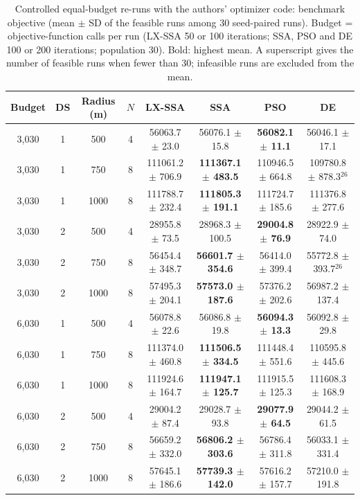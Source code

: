 \begin{table}[!t]
\centering
\caption{Controlled equal-budget re-runs with the authors' optimizer code: benchmark objective (mean $\pm$ SD of the feasible runs among 30 seed-paired runs). Budget = objective-function calls per run (LX-SSA 50 or 100 iterations; SSA, PSO and DE 100 or 200 iterations; population 30). Bold: highest mean. A superscript gives the number of feasible runs when fewer than 30; infeasible runs are excluded from the mean.}
\label{tab:equalbudget}
\footnotesize\setlength{\tabcolsep}{4pt}
\begin{tabular}{cccccccc}
\toprule
Budget & DS & Radius (m) & $N$ & LX-SSA & SSA & PSO & DE \\
\midrule
3,030 & 1 & 500 & 4 & 56063.7 $\pm$ 23.0 & 56076.1 $\pm$ 15.8 & \textbf{56082.1 $\pm$ 11.1} & 56046.1 $\pm$ 17.1 \\
3,030 & 1 & 750 & 8 & 111061.2 $\pm$ 706.9 & \textbf{111367.1 $\pm$ 483.5} & 110946.5 $\pm$ 664.8 & 109780.8 $\pm$ 878.3$^{26}$ \\
3,030 & 1 & 1000 & 8 & 111788.7 $\pm$ 232.4 & \textbf{111805.3 $\pm$ 191.1} & 111724.7 $\pm$ 185.6 & 111376.8 $\pm$ 277.6 \\
3,030 & 2 & 500 & 4 & 28955.8 $\pm$ 73.5 & 28968.3 $\pm$ 100.5 & \textbf{29004.8 $\pm$ 76.9} & 28922.9 $\pm$ 74.0 \\
3,030 & 2 & 750 & 8 & 56454.4 $\pm$ 348.7 & \textbf{56601.7 $\pm$ 354.6} & 56414.0 $\pm$ 399.4 & 55772.8 $\pm$ 393.7$^{26}$ \\
3,030 & 2 & 1000 & 8 & 57495.3 $\pm$ 204.1 & \textbf{57573.0 $\pm$ 187.6} & 57376.2 $\pm$ 202.6 & 56987.2 $\pm$ 137.4 \\
\midrule
6,030 & 1 & 500 & 4 & 56078.8 $\pm$ 22.6 & 56086.8 $\pm$ 19.8 & \textbf{56094.3 $\pm$ 13.3} & 56092.8 $\pm$ 29.8 \\
6,030 & 1 & 750 & 8 & 111374.0 $\pm$ 460.8 & \textbf{111506.5 $\pm$ 334.5} & 111448.4 $\pm$ 551.6 & 110595.8 $\pm$ 445.6 \\
6,030 & 1 & 1000 & 8 & 111924.6 $\pm$ 164.7 & \textbf{111947.1 $\pm$ 125.7} & 111915.5 $\pm$ 125.3 & 111608.3 $\pm$ 168.9 \\
6,030 & 2 & 500 & 4 & 29004.2 $\pm$ 87.4 & 29028.7 $\pm$ 93.8 & \textbf{29077.9 $\pm$ 64.5} & 29044.2 $\pm$ 61.5 \\
6,030 & 2 & 750 & 8 & 56659.2 $\pm$ 332.0 & \textbf{56806.2 $\pm$ 303.6} & 56786.4 $\pm$ 311.8 & 56033.1 $\pm$ 331.4 \\
6,030 & 2 & 1000 & 8 & 57645.1 $\pm$ 186.6 & \textbf{57739.3 $\pm$ 142.0} & 57616.2 $\pm$ 157.7 & 57210.0 $\pm$ 191.8 \\
\bottomrule
\end{tabular}
\end{table}

